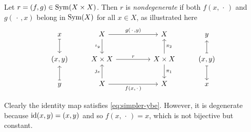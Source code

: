 \begin{defns}
    Let $r=(f,g)\in{\rm Sym}(X\times X)$. Then $r$ is \textsl{nondegenerate} if both $f(x,\,\cdot\,)$ and $g(\,\cdot\,,x)$ belong in ${\rm Sym}(X)$ for all $x\in X$, as illustrated here
    {\small
    $$
        \begin{tikzcd}
            x
                    \arrow[d,mapsto]
                &X
                    \arrow[rr,"{g(\,\cdot\,,y)}"]
                    \arrow[d,"\iota_y"']
                &&X
                &y\\
            {(x,y)}
            &X\times X
                    \arrow[rr,"r"]
                &&X\times X
                    \arrow[d,"\pi_1"]
                    \arrow[u,"\pi_2"']
                &{(x,y)}
                    \arrow[u,mapsto]
                    \arrow[d,mapsto]\\
                    y\arrow[u,mapsto]
                &X
                    \arrow[rr,"{f(x,\,\cdot\,)}"']
                    \arrow[u,"\jmath_x"]
                &&X
                &x
        \end{tikzcd}
    $$}
\end{defns}

\begin{rem}
    Clearly the identity map satisfies \eqref{eq:simpler-ybe}. However, it is degenerate because $\operatorname{id}(x,y)=(x,y)$ and so $f(x,\,\cdot\,)=x$, which is not bijective but constant.
\end{rem}
    
